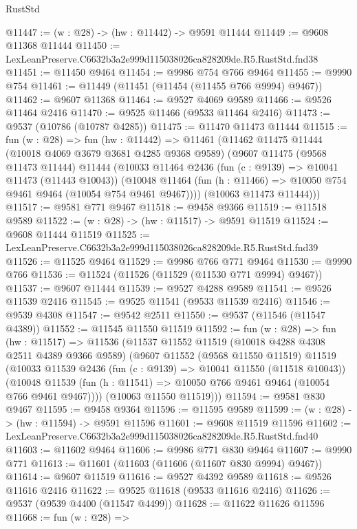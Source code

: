 \begin{lexlean}{RustStd}
\begin{coremodule}
@11447 := (w : @28) -> (hw : @11442) -> @9591 @11444
@11449 := @9608 @11368 @11444
@11450 := LexLeanPreserve.C6632b3a2e999d115038026ca828209de.R5.RustStd.fnd38
@11451 := @11450 @9464
@11454 := @9986 @754 @766 @9464
@11455 := @9990 @754
@11461 := @11449 (@11451 (@11454 (@11455 @766 @9994) @9467))
@11462 := @9607 @11368
@11464 := @9527 @4069 @9589
@11466 := @9526 @11464 @2416
@11470 := @9525 @11466 (@9533 @11464 @2416)
@11473 := @9537 (@10786 (@10787 @4285))
@11475 := @11470 @11473 @11444
@11515 := fun (w : @28) =>
  fun (hw : @11442) =>
  @11461
    (@11462
      @11475
      @11444
      (@10018 @4069 @3679 @3681 @4285 @9368 @9589)
      (@9607
        @11475
        (@9568 @11473 @11444)
        @11444
        (@10033
          @11464
          @2436
          (fun (c : @9139) => @10041 @11473 (@11443 @10043))
          (@10048 @11464 (fun (h : @11466) => @10050 @754 @9461 @9464 (@10054 @754 @9461 @9467))))
        (@10063 @11473 @11444)))
@11517 := @9581 @771 @9467
@11518 := @9458 @9366
@11519 := @11518 @9589
@11522 := (w : @28) -> (hw : @11517) -> @9591 @11519
@11524 := @9608 @11444 @11519
@11525 := LexLeanPreserve.C6632b3a2e999d115038026ca828209de.R5.RustStd.fnd39
@11526 := @11525 @9464
@11529 := @9986 @766 @771 @9464
@11530 := @9990 @766
@11536 := @11524 (@11526 (@11529 (@11530 @771 @9994) @9467))
@11537 := @9607 @11444
@11539 := @9527 @4288 @9589
@11541 := @9526 @11539 @2416
@11545 := @9525 @11541 (@9533 @11539 @2416)
@11546 := @9539 @4308
@11547 := @9542 @2511
@11550 := @9537 (@11546 (@11547 @4389))
@11552 := @11545 @11550 @11519
@11592 := fun (w : @28) =>
  fun (hw : @11517) =>
  @11536
    (@11537
      @11552
      @11519
      (@10018 @4288 @4308 @2511 @4389 @9366 @9589)
      (@9607
        @11552
        (@9568 @11550 @11519)
        @11519
        (@10033
          @11539
          @2436
          (fun (c : @9139) => @10041 @11550 (@11518 @10043))
          (@10048 @11539 (fun (h : @11541) => @10050 @766 @9461 @9464 (@10054 @766 @9461 @9467))))
        (@10063 @11550 @11519)))
@11594 := @9581 @830 @9467
@11595 := @9458 @9364
@11596 := @11595 @9589
@11599 := (w : @28) -> (hw : @11594) -> @9591 @11596
@11601 := @9608 @11519 @11596
@11602 := LexLeanPreserve.C6632b3a2e999d115038026ca828209de.R5.RustStd.fnd40
@11603 := @11602 @9464
@11606 := @9986 @771 @830 @9464
@11607 := @9990 @771
@11613 := @11601 (@11603 (@11606 (@11607 @830 @9994) @9467))
@11614 := @9607 @11519
@11616 := @9527 @4392 @9589
@11618 := @9526 @11616 @2416
@11622 := @9525 @11618 (@9533 @11616 @2416)
@11626 := @9537 (@9539 @4400 (@11547 @4499))
@11628 := @11622 @11626 @11596
@11668 := fun (w : @28) =>

\end{coremodule}
\end{lexlean}
